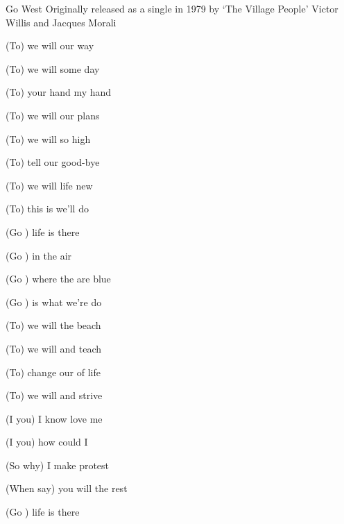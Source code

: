 \begin{SBSong}{Go West}
  {Originally released as a single in 1979 by `The Village People'}
  {Victor Willis and Jacques Morali}
  \begin{SBVerse}
    (To) we will  our way

    (To) we will  some day

    (To) your hand  my hand

    (To) we will  our plans

    (To) we will  so high

    (To) tell our  good-bye

    (To) we will  life new

    (To) this is  we'll do
  \end{SBVerse}

  \begin{SBChorus}
    (Go ) life is  there

    (Go ) in the  air

    (Go ) where the  are blue

    (Go ) is what we're  do
  \end{SBChorus}

  \begin{SBVerse}
    (To) we will  the beach

    (To) we will  and teach

    (To) change our  of life

    (To) we will  and strive

    (I  you) I know  love me

    (I  you) how could I 

    (So  why) I make  protest

    (When  say) you will  the rest
  \end{SBVerse}

  \begin{SBChorus}
    (Go ) life is  there


\end{SBChorus}
\end{SBSong}
